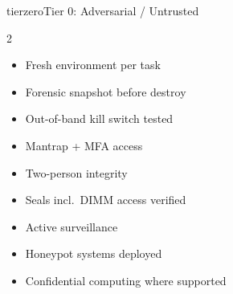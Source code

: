 \documentclass[11pt,letterpaper]{article}
\begin{document}
\begin{checkbox}{tierzero}{Tier 0: Adversarial / Untrusted}
\begin{multicols}{2}
\begin{itemize}[leftmargin=1.4em, itemsep=0.15em]
  \item[{\color{tierzero!80!black}$\square$}] Fresh environment per task
  \item[{\color{tierzero!80!black}$\square$}] Forensic snapshot before destroy
  \item[{\color{tierzero!80!black}$\square$}] Out-of-band kill switch tested
  \item[{\color{tierzero!80!black}$\square$}] Mantrap + MFA access
  \item[{\color{tierzero!80!black}$\square$}] Two-person integrity
  \item[{\color{tierzero!80!black}$\square$}] Seals incl.\ DIMM access verified
  \item[{\color{tierzero!80!black}$\square$}] Active surveillance
  \item[{\color{tierzero!80!black}$\square$}] Honeypot systems deployed
  \item[{\color{tierzero!80!black}$\square$}] Confidential computing where supported
\end{itemize}
\end{multicols}
\end{checkbox}
\end{document}
